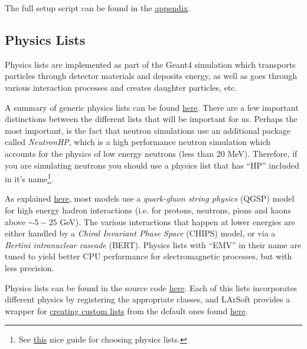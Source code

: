 \documentclass[8pt]{refart}
\begin{document}
The full setup script can be found in the \hyperref[fnalsetupscript]{appendix}.

\subsection{Physics Lists}
Physics lists are implemented as part of the Geant4 simulation which transports particles through detector materials and deposits energy, as well as goes through various interaction processes and creates daughter particles, etc.  


A summary of generic physics lists can be found \href{https://geant4.web.cern.ch/node/155}{here}.  There are a few important distinctions between the different lists that will be important for us.  Perhaps the most important, is the fact that neutron simulations use an additional package called \textit{NeutronHP}, which is a high performance neutron simulation which accounts for the physics of low energy neutrons (less than 20 MeV).  Therefore, if you are simulating neutrons you should use a physics list that has ``HP'' included in it's name\footnote{See \href{http://geant4.in2p3.fr/IMG/pdf_PhysicsLists.pdf}{this} nice guide for choosing physics lists.}.

As explained \href{https://geant4.web.cern.ch/node/155}{here}, most models use a \textit{quark-gluon string physics} (QGSP) model for high energy hadron interactions 
(i.e. for protons, neutrons, pions and kaons above $\sim 5-25$ GeV).  The various interactions that happen at lower energies are either handled by a \textit{Chiral Invariant Phase Space} (CHIPS) model, or via a \textit{Bertini intranuclear cascade} (BERT).  Physics lists with ``EMV'' in their name are tuned to yield better CPU performance for electromagnetic processes, but with less precision.  

Physics lists can be found in the source code \href{https://github.com/Geant4/geant4/tree/master/source/physics_lists}{here}.  Each of this lists incorporates different physics by registering the appropriate classes, and LArSoft provides a wrapper for \href{https://internal.dunescience.org/doxygen/classlarg4_1_1CustomPhysicsFactory.html}{creating custom lists} from the default ones found \href{https://internal.dunescience.org/doxygen/AllPhysicsLists_8h_source.html}{here}.  
\end{document}
